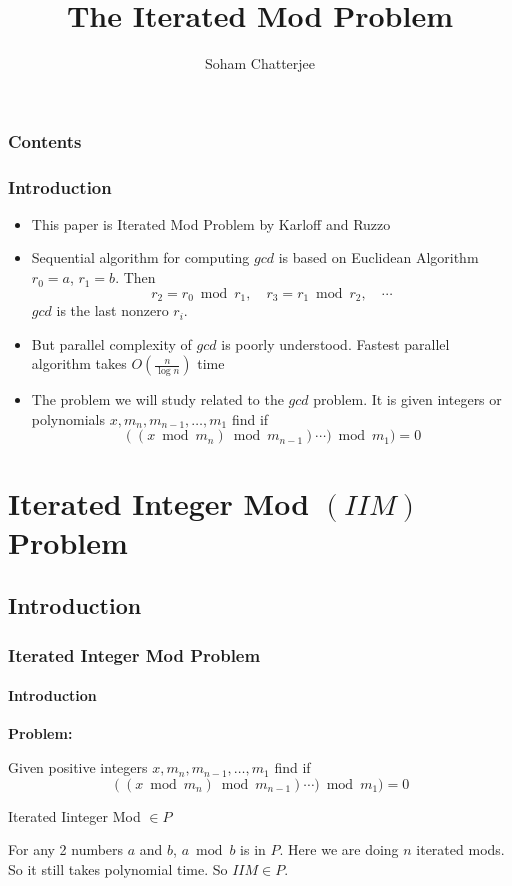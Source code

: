 \documentclass[article,10pt]{beamer}%
\title{The Iterated Mod Problem}
\author{\LARGE{Soham Chatterjee}}
\institute{\large{Chennai Mathematical Institute}}
\begin{document}
\maketitle


\begin{frame}
    \frametitle{Contents}
    \tableofcontents
\end{frame}



\begin{frame}
    \frametitle{Introduction}
\begin{itemize}
    \item This paper is  Iterated Mod Problem by Karloff and Ruzzo \cite{iteratedmod}
    \item  Sequential algorithm for computing $gcd$ is based on Euclidean Algorithm
    $r_0=a$, $r_1=b$. Then $$r_2=r_0\bmod{r_1},\quad r_{3}=r_{1}\bmod{r_2}, \quad \cdots$$ $gcd$ is the last nonzero $r_i$.
    \item But parallel complexity of $gcd$ is poorly understood. Fastest parallel  algorithm takes $O\left(\frac{n}{\log n}\right)$ time \cite{gcdfastpar}
    \item  The problem we will study related to the $gcd$ problem. It is given  integers or polynomials $x, m_n,m_{n-1},\dots, m_1$  find if $$((x\bmod{m_{n}})\bmod{m_{n-1}})\cdots)\bmod{m_{1}})=0$$
\end{itemize}
\end{frame}
\section{Iterated Integer Mod $(IIM)$ Problem}
\subsection{Introduction}
\begin{frame}
	\frametitle{Iterated Integer Mod Problem}
	\framesubtitle{Introduction}
	\textbf{Problem:}
	
		 Given positive integers $x, m_n,m_{n-1},\dots, m_1$  find if $$((x\bmod{m_{n}})\bmod{m_{n-1}})\cdots)\bmod{m_{1}})=0$$
\vspace{3mm}
		 \begin{theorem}
		Iterated Iinteger Mod $\in P$
	\end{theorem}
	For any 2 numbers $a$ and $b$, $a\bmod{b}$ is in $P$. Here we are doing $n$ iterated mods. So it still takes polynomial time. So $IIM\in P$.
\end{frame}
\end{document}
